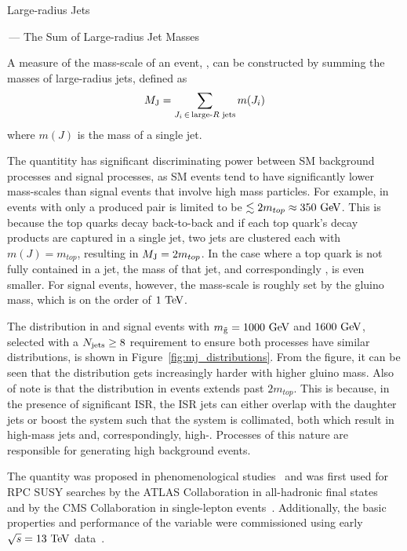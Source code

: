 \begin{section}{Large-radius Jets}
\begin{subsection}{\MJ\,--- The Sum of Large-radius Jet Masses}
\label{subsec:MJ}

A measure of the mass-scale of an event, \MJ, can be constructed by summing the masses of large-radius jets, defined as
\begin{align}
M_{\mathrm{J}} = \sum_{J_{i}\, \in\, {\text{large-}R\text{ jets}}} m(J_i)
\end{align}
where $m(J)$ is the mass of a single \largeR jet.

The quantitity \MJ has significant discriminating power between SM background processes and signal processes, as SM events tend to have significantly lower mass-scales than signal events that involve high mass particles.
For example, \MJ in events with only a produced \ttbar pair is limited to be $\lesssim 2m_{top} \approx 350~\mathrm{Ge\kern -0.1em V}$.
This is because the top quarks decay back-to-back and if each top quark's decay products are captured in a single \largeR jet, two \largeR jets are clustered each with $m(J) = m_{top}$, resulting in $M_{\mathrm{J}} = 2m_{top}$.
In the case where a top quark is not fully contained in a \largeR jet, the mass of that \largeR jet, and correspondingly \MJ, is even smaller.
For signal events, however, the mass-scale is roughly set by the gluino mass, which is on the order of $1~\mathrm{Te\kern -0.1em V}$.

The \MJ distribution in \ttbar and signal events with $m_{\tilde{\mathrm{g}}} = 1000~\mathrm{Ge\kern -0.1em V}$ and $1600~\mathrm{Ge\kern -0.1em V}$, selected with a $N_{\mathrm{jets}} \geq 8$ requirement to ensure both processes have similar \Njets distributions, is shown in Figure~\ref{fig:mj_distributions}. 
From the figure, it can be seen that the \MJ distribution gets increasingly harder with higher gluino mass.
Also of note is that the \MJ distribution in \ttbar events extends past $2m_{top}$.
This is because, in the presence of significant ISR, the ISR jets can either overlap with the \ttbar daughter jets or boost the \ttbar system such that the system is collimated, both which result in high-mass \largeR jets and, correspondingly, high-\MJ.
Processes of this nature are responsible for generating high \MJ background events.

The quantity \MJ was proposed in phenomenological studies~\cite{Hook:2012fd,Cohen:2012yc,Hedri:2013pvl} and was first used for RPC SUSY searches by the ATLAS Collaboration in all-hadronic final states~\cite{Aad:2015lea,Aad:2013wta} and by the CMS Collaboration in single-lepton events~\cite{Khachatryan:2016uwr,Sirunyan:2017fsj}.
Additionally, the basic properties and performance of the \MJ variable were commissioned using early $\sqrt{s} = 13~\mathrm{Te\kern -0.1em V}$ data~\cite{CMS-DP-2015-035}.


\end{subsection}
\end{section}
